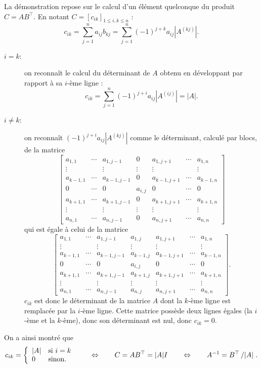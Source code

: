 La démonstration repose sur le calcul d'un élément quelconque du produit $C = A B^\top$. En notant $C = [c_{ik}]_{1 \leq i, k \leq n}$ : 
$$
c_{ik} 
= \sum_{j=1}^n a_{ij} b_{kj} 
= \sum_{j=1}^n (-1)^{j+k} a_{ij} |A^{(kj)}|.
$$
\begin{description}
  \item[$i = k$:] on reconnaît le calcul du déterminant de $A$ obtenu en développant par rapport à sa $i$-ème ligne : 
  $$
  c_{ik} 
  = \sum_{j=1}^n (-1)^{j+i} a_{ij} |A^{(ij)}|
  = |A|.
  $$
  \item[$i \neq k$:] on reconnaît $(-1)^{j+i} a_{ij} |A^{(kj)}|$ comme le déterminant, calculé par blocs, de la matrice
  $$
  \left[\begin{array}{ccccccc}
         a_{1, 1} & \cdots & a_{1,j-1} & 0 & a_{1, j+1} & \cdots & a_{1, n} \\
         \vdots & & \vdots & \vdots & \vdots &  & \vdots \\
         a_{k-1,1} & \cdots & a_{k-1,j-1} & 0 & a_{k-1, j+1} & \cdots & a_{k-1, n} \\
         0 & \cdots & 0 & a_{i, j} & 0 & \cdots & 0 \\
         a_{k+1,1} & \cdots & a_{k+1,j-1} & 0 & a_{k+1, j+1} & \cdots & a_{k+1, n} \\
         \vdots & & \vdots & \vdots & \vdots &  & \vdots \\
         a_{n, 1} & \cdots & a_{n,j-1} & 0 & a_{n, j+1} & \cdots & a_{n, n} 
        \end{array}\right]
  $$
  qui est égale à celui de la matrice
  $$
  \left[\begin{array}{ccccccc}
         a_{1, 1} & \cdots & a_{1,j-1} & a_{1, j} & a_{1, j+1} & \cdots & a_{1, n} \\
         \vdots & & \vdots & \vdots & \vdots &  & \vdots \\
         a_{k-1,1} & \cdots & a_{k-1,j-1} & a_{k-1, j} & a_{k-1, j+1} & \cdots & a_{k-1, n} \\
         0 & \cdots & 0 & a_{i, j} & 0 & \cdots & 0 \\
         a_{k+1,1} & \cdots & a_{k+1,j-1} & a_{k+1, j} & a_{k+1, j+1} & \cdots & a_{k+1, n} \\
         \vdots & & \vdots & \vdots & \vdots &  & \vdots \\
         a_{n, 1} & \cdots & a_{n,j-1} & a_{n, j} & a_{n, j+1} & \cdots & a_{n, n} 
        \end{array}\right].
  $$
  $c_{ik}$ est donc le déterminant de la matrice $A$ dont la $k$-ème ligne est remplacée par la $i$-ème ligne. 
  Cette matrice possède deux lignes égales (la $i$-ème et la $k$-ème), donc son déterminant est nul, donc $c_{ik} = 0$.
\end{description}
On a ainsi montré que
$$
c_{ik} = \left\{\begin{array}{ll} 
                  |A| & \text{si $i = k$} \\
                  0 & \text{sinon}.
                \end{array} \right.
\qquad \Leftrightarrow \qquad
C = AB^\top = |A| I
\qquad \Leftrightarrow \qquad
A^{-1} = B^\top \left/|A|\right..
$$
\eproof
